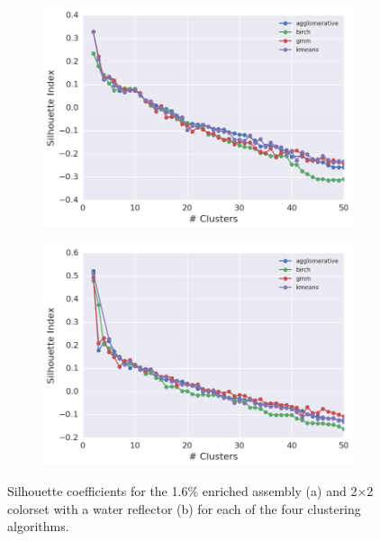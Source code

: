 \begin{figure}[h!]
\centering
\begin{subfigure}{\textwidth}
  \centering
  \includegraphics[width=0.9\linewidth]{figures/results/model-select/assm-16/silhouette-combined-U238-capture-1}
  \caption{}
  \label{fig:chap11-assm-16-silhouette-coeff}
\end{subfigure}
\begin{subfigure}{\textwidth}
  \centering
  \includegraphics[width=0.9\linewidth]{figures/results/model-select/reflector/silhouette-combined-U238-nu-fission-1}
  \caption{}
  \label{fig:chap11-refl-silhouette-coeff}
\end{subfigure}
\caption[Silhouette coefficients]{Silhouette coefficients for the 1.6\% enriched assembly (a) and 2$\times$2 colorset with a water reflector (b) for each of the four clustering algorithms.}
\label{fig:chap11-silhouette-coeffs}
\end{figure}

